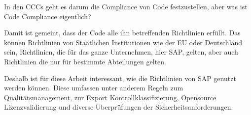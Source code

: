 \documentclass[../main.tex]{subfiles}
\begin{document}
In den \glspl{CCC} geht es darum die Compliance von Code festzustellen, aber was ist Code Compliance eigentlich?

Damit ist gemeint, dass der Code alle ihn betreffenden Richtlinien erfüllt.
Das können Richtlinien von Staatlichen Institutionen wie der \gls{EU} oder Deutschland sein, Richtlinien, die für das ganze Unternehmen, hier SAP, gelten, aber auch Richtlinien die nur für bestimmte Abteilungen gelten.

Deshalb ist für diese Arbeit interessant, wie die Richtlinien von SAP genutzt werden können.
Diese umfassen unter anderem Regeln zum Qualitätsmanagement, zur Export Kontrollklassifizierung, Opensource Lizenzvalidierung und diverse Überprüfungen der Sicherheitsanforderungen.
\end{document}
